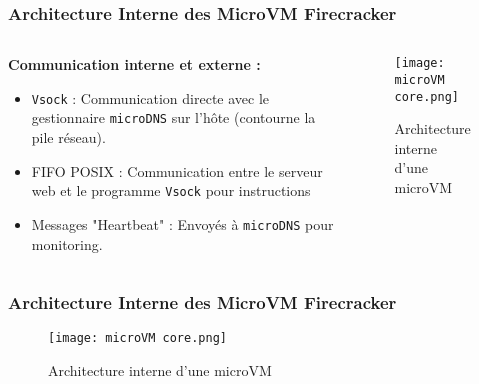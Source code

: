 \documentclass[12pt]{beamer}
\begin{document}
	\begin{frame}
		\frametitle{Architecture Interne des MicroVM Firecracker}
		\begin{columns}[T]
			\begin{column}{0.5\textwidth}
				\RaggedRight
				\textbf{Communication interne et externe :}
				\begin{itemize}
					\item \texttt{Vsock} : Communication directe avec le gestionnaire \texttt{microDNS} sur l'hôte (contourne la pile réseau).
					\item FIFO POSIX : Communication entre le serveur web et le programme \texttt{Vsock} pour instructions
					\item Messages "Heartbeat" : Envoyés à \texttt{microDNS} pour monitoring.
				\end{itemize}
			\end{column}
			\begin{column}{0.5\textwidth}
				\begin{figure}
					\texttt{[image: microVM core.png]}
					\caption{Architecture interne d'une microVM}
				\end{figure}
			\end{column}
		\end{columns}
	\end{frame}

	\begin{frame}
		\frametitle{Architecture Interne des MicroVM Firecracker}
				\begin{figure}
					\centering
					\texttt{[image: microVM core.png]}
					\caption{Architecture interne d'une microVM}
				\end{figure}
	\end{frame}

\end{document}
